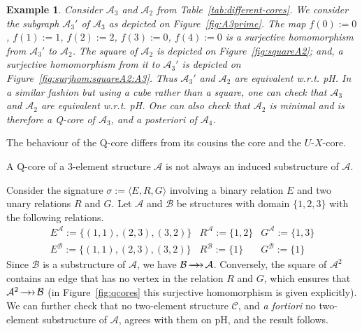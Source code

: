 \documentclass{LMCS}
\newtheorem{ex}{Example}
\newcommand{\surhom}{
  \ensuremath{
      \negthinspace 
      \longrightarrow
      \hspace{-5mm} \rightarrow \hspace{1mm}
  }
}
\begin{document}
\begin{ex}
  Consider $\mathcal{A}_3$ and $\mathcal{A}_2$ from
  Table~\ref{tab:different-cores}.
  We consider the subgraph $\mathcal{A}_3'$ of $\mathcal{A}_3$ as
  depicted on Figure~\ref{fig:A3prime}.
  The map $f(0):=0$, $f(1):=1$, $f(2):=2$, $f(3):=0$, $f(4):=0$
is a surjective homomorphism from 
  $\mathcal{A}_3'$ to $\mathcal{A}_2$.
  The square of $\mathcal{A}_2$  is depicted on
  Figure~\ref{fig:squareA2};
  and, a surjective homomorphism from it to $\mathcal{A}_3'$ is
  depicted on Figure~\ref{fig:surjhom:squareA2:A3}. 
  Thus $\mathcal{A}_3'$ and $\mathcal{A}_2$ are equivalent
  w.r.t. pH.
  In a similar fashion but using a cube rather than a square, one can
  check that $\mathcal{A}_3$ and $\mathcal{A}_2$ are equivalent
  w.r.t. pH.
  One can also check that $\mathcal{A}_2$ is minimal and is therefore
  a Q-core of $\mathcal{A}_3$, and \textsl{a posteriori} of
  $\mathcal{A}_4$.
\end{ex}
The behaviour of the Q-core differs from its cousins the core and the
$U$-$X$-core.
\begin{prop}
A Q-core of a $3$-element structure $\mathcal{A}$ is not always an induced substructure of $\mathcal{A}$.
\end{prop}
\proof
  Consider the signature $\sigma:=\langle E,R,G\rangle$ involving a
  binary relation $E$ and two unary relations $R$ and $G$. Let
  $\mathcal{A}$ and $\mathcal{B}$ be structures with domain
  $\{1,2,3\}$ with the following relations. 
  \[ 
  \begin{array}{ccc}
    E^{\mathcal{A}}:=\{(1,1),(2,3),(3,2)\} & R^\mathcal{A}:=\{1,2\} & G^\mathcal{A}:=\{1,3\} \\
    E^{\mathcal{B}}:=\{(1,1),(2,3),(3,2)\} & R^\mathcal{B}:=\{1\} & G^\mathcal{B}:=\{1\}
  \end{array}
  \]
  Since $\mathcal{B}$ is a substructure of $\mathcal{A}$, we have $\mathcal{B} \surhom \mathcal{A}$.
  Conversely, the square of $\mathcal{A}^2$ contains an edge that has
  no vertex in the relation $R$ and $G$, which ensures that $\mathcal{A}^2 \surhom \mathcal{B}$
  (in Figure~\ref{fig:qcores} this surjective homomorphism is given explicitly).
  We can further check that no two-element structure $\mathcal{C}$, and \emph{a
  fortiori} no two-element substructure of $\mathcal{A}$, agrees with
  them on pH, and the result follows.
\end{document}
